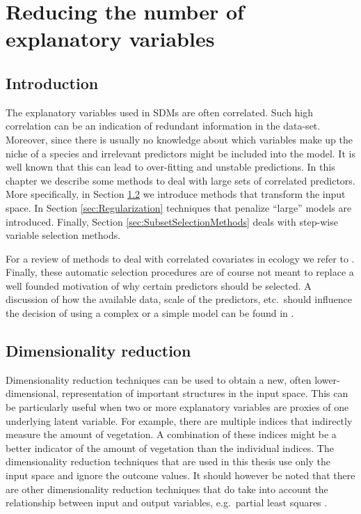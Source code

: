 \chapter{Reducing the number of explanatory variables}
\label{ch:ReducingTheNumberOfExplanatoryVariables}

\section{Introduction}
The explanatory variables used in SDMs are often correlated. Such high correlation can be an indication of redundant information in the data-set. Moreover, since there is usually no knowledge about which variables make up the niche of a species and irrelevant predictors might be included into the model. It is well known that this can lead to over-fitting and unstable predictions. In this chapter we describe some methods to deal with large sets of correlated predictors. More specifically, in Section \ref{sec:DimensionalityReduction} we introduce methods that transform the input space. In Section \ref{sec:Regularization} techniques that penalize ``large'' models are introduced. Finally, Section \ref{sec:SubsetSelectionMethods} deals with step-wise variable selection methods.


For a review of methods to deal with correlated covariates in ecology we refer to \cite{dormann_collinearity:_2013}. Finally, these automatic selection procedures are of course not meant to replace a well founded motivation of why certain predictors should be selected. A discussion of how the available data, scale of the predictors, etc.\ should influence the decision of using a complex or a simple model can be found in \cite{merow_what_2014}.

\section{Dimensionality reduction}
\label{sec:DimensionalityReduction}
Dimensionality reduction techniques can be used to obtain a new, often lower-dimensional, representation of important structures in the input space. This can be particularly useful when two or more explanatory variables are proxies of one underlying latent variable. For example, there are multiple indices that indirectly measure the amount of vegetation. A combination of these indices might be a better indicator of the amount of vegetation than the individual indices. The dimensionality reduction techniques that are used in this thesis use only the input space and ignore the outcome values. It should however be noted that there are other dimensionality reduction techniques that do take into account the relationship between input and output variables, e.g.\ partial least squares \parencite[see e.g.][]{marx_iteratively_1996}.


